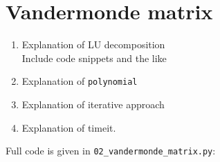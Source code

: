 \section{Vandermonde matrix}
\begin{enumerate}[label=(\alph*)]
    \item Explanation of LU decomposition\\
          Include code snippets and the like
    \item Explanation of \texttt{polynomial}
    \item Explanation of iterative approach
    \item Explanation of timeit.
\end{enumerate}

Full code is given in \texttt{02\_vandermonde\_matrix.py}:

